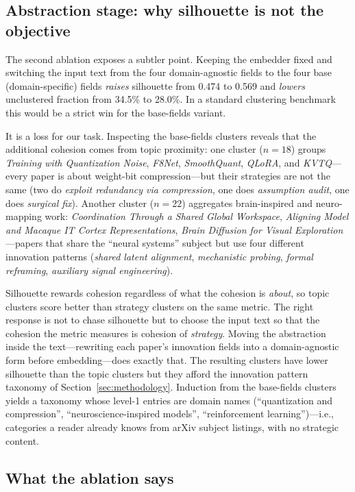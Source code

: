\documentclass[10pt,a4paper]{article}
\begin{document}
\subsection{Abstraction stage: why silhouette is not the objective}

The second ablation exposes a subtler point. Keeping the embedder fixed and switching the input text from the four domain-agnostic fields to the four base (domain-specific) fields \emph{raises} silhouette from 0.474 to 0.569 and \emph{lowers} unclustered fraction from 34.5\% to 28.0\%. In a standard clustering benchmark this would be a strict win for the base-fields variant.

It is a loss for our task. Inspecting the base-fields clusters reveals that the additional cohesion comes from topic proximity: one cluster ($n{=}18$) groups \emph{Training with Quantization Noise}, \emph{F8Net}, \emph{SmoothQuant}, \emph{QLoRA}, and \emph{KVTQ}---every paper is about weight-bit compression---but their strategies are not the same (two do \emph{exploit redundancy via compression}, one does \emph{assumption audit}, one does \emph{surgical fix}). Another cluster ($n{=}22$) aggregates brain-inspired and neuro-mapping work: \emph{Coordination Through a Shared Global Workspace}, \emph{Aligning Model and Macaque IT Cortex Representations}, \emph{Brain Diffusion for Visual Exploration}---papers that share the ``neural systems'' subject but use four different innovation patterns (\emph{shared latent alignment}, \emph{mechanistic probing}, \emph{formal reframing}, \emph{auxiliary signal engineering}).

Silhouette rewards cohesion regardless of what the cohesion is \emph{about}, so topic clusters score better than strategy clusters on the same metric. The right response is not to chase silhouette but to choose the input text so that the cohesion the metric measures is cohesion of \emph{strategy}. Moving the abstraction inside the text---rewriting each paper's innovation fields into a domain-agnostic form before embedding---does exactly that. The resulting clusters have lower silhouette than the topic clusters but they afford the innovation pattern taxonomy of Section~\ref{sec:methodology}. Induction from the base-fields clusters yields a taxonomy whose level-1 entries are domain names (``quantization and compression'', ``neuroscience-inspired models'', ``reinforcement learning'')---i.e., categories a reader already knows from arXiv subject listings, with no strategic content.

\subsection{What the ablation says}
\end{document}
